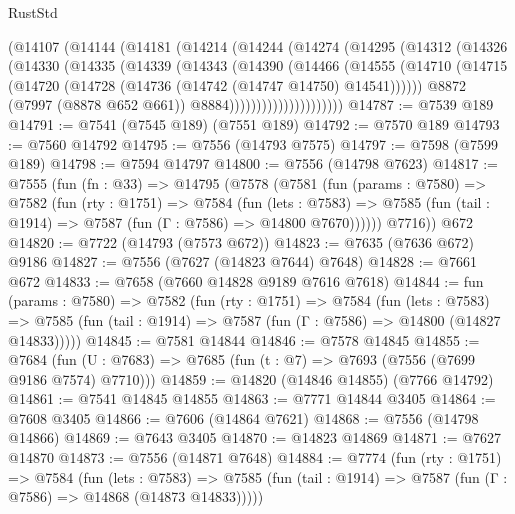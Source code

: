 \begin{lexlean}{RustStd}
\begin{coremodule}
{\begin{coremodule}
{{{{{{{{{{{{{{{{{{{{{{{{{{{{{{{{{{{{{{{{{{{              (@14107
                (@14144
                  (@14181
                    (@14214
                      (@14244
                        (@14274
                          (@14295
                            (@14312
                              (@14326
                                (@14330
                                  (@14335
                                    (@14339
                                      (@14343
                                        (@14390
                                          (@14466
                                            (@14555
                                              (@14710
                                                (@14715
                                                  (@14720
                                                    (@14728
                                                      (@14736 (@14742 (@14747 @14750) @14541))))))
                                              @8872
                                              (@7997 (@8878 @652 @661))
                                              @8884)))))))))))))))))))))
@14787 := @7539 @189
@14791 := @7541 (@7545 @189) (@7551 @189)
@14792 := @7570 @189
@14793 := @7560 @14792
@14795 := @7556 (@14793 @7575)
@14797 := @7598 (@7599 @189)
@14798 := @7594 @14797
@14800 := @7556 (@14798 @7623)
@14817 := @7555
    (fun (fn : @33) =>
    @14795
      (@7578
        (@7581
          (fun (params : @7580) =>
          @7582
            (fun (rty : @1751) =>
            @7584
              (fun (lets : @7583) =>
              @7585 (fun (tail : @1914) => @7587 (fun (Γ : @7586) => @14800 @7670))))))
        @7716))
    @672
@14820 := @7722 (@14793 (@7573 @672))
@14823 := @7635 (@7636 @672) @9186
@14827 := @7556 (@7627 (@14823 @7644) @7648)
@14828 := @7661 @672
@14833 := @7658 (@7660 @14828 @9189 @7616 @7618)
@14844 := fun (params : @7580) =>
  @7582
    (fun (rty : @1751) =>
    @7584
      (fun (lets : @7583) =>
      @7585 (fun (tail : @1914) => @7587 (fun (Γ : @7586) => @14800 (@14827 @14833)))))
@14845 := @7581 @14844
@14846 := @7578 @14845
@14855 := @7684 (fun (U : @7683) => @7685 (fun (t : @7) => @7693 (@7556 (@7699 @9186 @7574) @7710)))
@14859 := @14820 (@14846 @14855) (@7766 @14792)
@14861 := @7541 @14845 @14855
@14863 := @7771 @14844 @3405
@14864 := @7608 @3405
@14866 := @7606 (@14864 @7621)
@14868 := @7556 (@14798 @14866)
@14869 := @7643 @3405
@14870 := @14823 @14869
@14871 := @7627 @14870
@14873 := @7556 (@14871 @7648)
@14884 := @7774
    (fun (rty : @1751) =>
    @7584
      (fun (lets : @7583) =>
      @7585 (fun (tail : @1914) => @7587 (fun (Γ : @7586) => @14868 (@14873 @14833)))))
}}}}}}}}}}}}}}}}}}}}}}}}}}}}}}}}}}}}}}}}}}}
\end{coremodule}}
\end{coremodule}
\end{lexlean}
